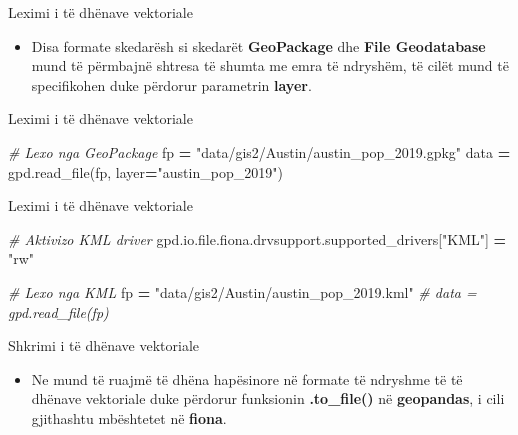 \documentclass[
  ignorenonframetext,
]{beamer}
\newenvironment{Shaded}{\begin{snugshade}}{\end{snugshade}}
\newcommand{\BuiltInTok}[1]{#1}
\newcommand{\CommentTok}[1]{\textcolor[rgb]{0.56,0.35,0.01}{\textit{#1}}}
\newcommand{\NormalTok}[1]{#1}
\newcommand{\OperatorTok}[1]{\textcolor[rgb]{0.81,0.36,0.00}{\textbf{#1}}}
\newcommand{\StringTok}[1]{\textcolor[rgb]{0.31,0.60,0.02}{#1}}
\providecommand{\tightlist}{%
  \setlength{\itemsep}{0pt}\setlength{\parskip}{0pt}}
\begin{document}
\begin{frame}{Leximi i të dhënave vektoriale}
\protect\hypertarget{leximi-i-tuxeb-dhuxebnave-vektoriale-7}{}
\begin{itemize}
\tightlist
\item
  Disa formate skedarësh si skedarët \textbf{GeoPackage} dhe
  \textbf{File Geodatabase} mund të përmbajnë shtresa të shumta me emra
  të ndryshëm, të cilët mund të specifikohen duke përdorur parametrin
  \textbf{layer}.
\end{itemize}
\end{frame}

\begin{frame}[fragile]{Leximi i të dhënave vektoriale}
\protect\hypertarget{leximi-i-tuxeb-dhuxebnave-vektoriale-8}{}

\begin{Shaded}
\begin{Highlighting}[]
\CommentTok{\# Lexo nga GeoPackage }
\NormalTok{fp }\OperatorTok{=} \StringTok{"data/gis2/Austin/austin\_pop\_2019.gpkg"}
\NormalTok{data }\OperatorTok{=}\NormalTok{ gpd.read\_file(fp, layer}\OperatorTok{=}\StringTok{"austin\_pop\_2019"}\NormalTok{)}
\end{Highlighting}
\end{Shaded}
\end{frame}

\begin{frame}[fragile]{Leximi i të dhënave vektoriale}
\protect\hypertarget{leximi-i-tuxeb-dhuxebnave-vektoriale-9}{}

\begin{Shaded}
\begin{Highlighting}[]
\CommentTok{\# Aktivizo KML driver}
\NormalTok{gpd.io.}\BuiltInTok{file}\NormalTok{.fiona.drvsupport.supported\_drivers[}\StringTok{"KML"}\NormalTok{] }\OperatorTok{=} \StringTok{"rw"}

\CommentTok{\# Lexo nga KML}
\NormalTok{fp }\OperatorTok{=} \StringTok{"data/gis2/Austin/austin\_pop\_2019.kml"}
\CommentTok{\# data = gpd.read\_file(fp)}
\end{Highlighting}
\end{Shaded}
\end{frame}

\begin{frame}{Shkrimi i të dhënave vektoriale}
\protect\hypertarget{shkrimi-i-tuxeb-dhuxebnave-vektoriale}{}
\begin{itemize}
\tightlist
\item
  Ne mund të ruajmë të dhëna hapësinore në formate të ndryshme të të
  dhënave vektoriale duke përdorur funksionin \textbf{.to\_file()} në
  \textbf{geopandas}, i cili gjithashtu mbështetet në \textbf{fiona}.
\end{itemize}
\end{frame}
\end{document}

